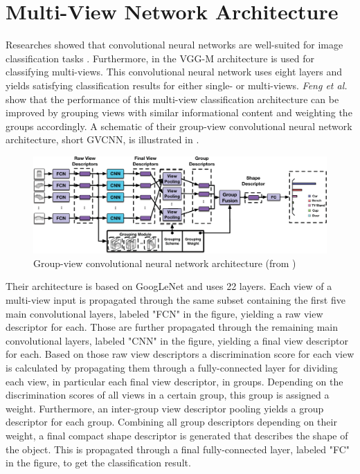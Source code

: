 \section{Multi-View Network Architecture}
\label{sec:methods-architecture}
Researches showed that convolutional neural networks are well-suited for image classification tasks \cite{Simonyan15, He2016ResNet, SzegedyInceptionv4}.
Furthermore, in \cite{Su:2015:MCN:2919332.2919750} the VGG-M \cite{journals/corr/ChatfieldSVZ14} architecture is used for classifying multi-views.
This convolutional neural network uses eight layers and yields satisfying classification results for either single- or multi-views.
\textit{Feng et al.} \cite{Feng2018} show that the performance of this multi-view classification architecture can be improved by grouping views with similar informational content and weighting the groups accordingly.
A schematic of their group-view convolutional neural network architecture, short GVCNN, is illustrated in .
\begin{figure}
	\centering
	\includegraphics[width=\textwidth]{images/gvcnn_framework.png}
	\caption{Group-view convolutional neural network architecture (from \cite{Feng2018})}
	\label{fig:gvcnn-framework}
\end{figure}
Their architecture is based on GoogLeNet \cite{szegedy2015} and uses 22 layers.
Each view of a multi-view input is propagated through the same subset containing the first five main convolutional layers, labeled "FCN" in the figure, yielding a raw view descriptor for each.
Those are further propagated through the remaining main convolutional layers, labeled "CNN" in the figure, yielding a final view descriptor for each.
Based on those raw view descriptors a discrimination score for each view is calculated by propagating them through a fully-connected layer for dividing each view, in particular each final view descriptor, in groups.
Depending on the discrimination scores of all views in a certain group, this group is assigned a weight.
Furthermore, an inter-group view descriptor pooling yields a group descriptor for each group.
Combining all group descriptors depending on their weight, a final compact shape descriptor is generated that describes the shape of the object.
This is propagated through a final fully-connected layer, labeled "FC" in the figure, to get the classification result.

